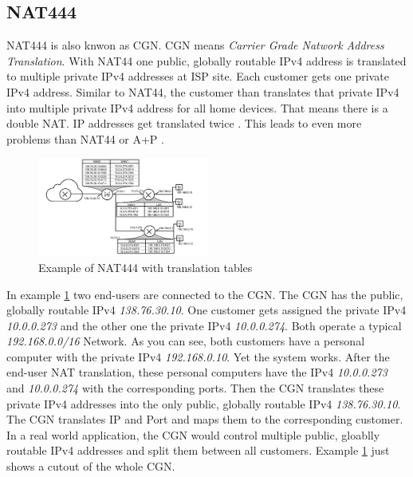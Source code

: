 \documentclass[format=sigconf, natbib=true, nonacm=true]{acmart}
\begin{document}
    \subsection{NAT444}
    NAT444 is also knwon as CGN. CGN means \textit{Carrier Grade Natwork Address Translation}. With NAT44 one public, globally routable IPv4 address is translated to multiple private IPv4 addresses at ISP site. Each customer gets one private IPv4 address. Similar to NAT44, the customer than translates that private IPv4 into multiple private IPv4 address for all home devices. That means there is a double NAT. IP addresses get translated twice \cite{10.1145/2987443.2987474}. This leads to even more problems than NAT44 or A+P \cite{8716482}.
    \begin{figure}
        \centering
        \includegraphics[width=0.5\textwidth]{images/nat_444.png}
        \caption{Example of NAT444 with translation tables}
        \label{fig:nat_444}
    \end{figure}
    In example \ref{fig:nat_444} two end-users are connected to the CGN. The CGN has the public, globally routable IPv4 \textit{138.76.30.10}. One customer gets assigned the private IPv4 \textit{10.0.0.273} and the other one the private IPv4 \textit{10.0.0.274}. Both operate a typical \textit{192.168.0.0/16} Network. As you can see, both customers have a personal computer with the private IPv4 \textit{192.168.0.10}. Yet the system works. After the end-user NAT translation, these personal computers have the IPv4 \textit{10.0.0.273} and \textit{10.0.0.274} with the corresponding ports. Then the CGN translates these private IPv4 addresses into the only public, globally routable IPv4 \textit{138.76.30.10}. The CGN translates IP and Port and maps them to the corresponding customer. In a real world application, the CGN would control multiple public, gloablly routable IPv4 addresses and split them between all customers. Example \ref{fig:nat_444} just shows a cutout of the whole CGN\cite{Hughes2022_C11}.
\end{document}

